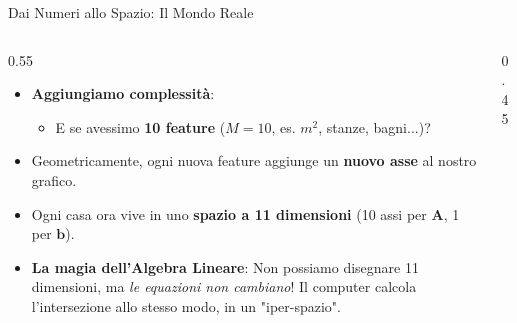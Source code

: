 \documentclass[aspectratio=169, 10pt]{beamer}
\begin{document}
\begin{frame}{Dai Numeri allo Spazio: Il Mondo Reale}
\begin{columns}[T]
    \begin{column}{0.55\textwidth}
        \small
        \begin{itemize}
            \setlength\itemsep{0.7em} %
            \item \textbf{Aggiungiamo complessità}:
            \begin{itemize}
                \item E se avessimo \textbf{10 feature} ($M=10$, es. $m^2$, stanze, bagni...)?
            \end{itemize}
            \item Geometricamente, ogni nuova feature aggiunge un \textbf{nuovo asse} al nostro grafico.
            \item Ogni casa ora vive in uno \textbf{spazio a 11 dimensioni} (10 assi per $\mathbf{A}$, 1 per $\mathbf{b}$).
            \item \textbf{La magia dell'Algebra Lineare}: 
            Non possiamo disegnare 11 dimensioni, ma \emph{le equazioni non cambiano}! Il computer calcola l'intersezione allo stesso modo, in un "iper-spazio".
        \end{itemize}
    \end{column}
    
    \begin{column}{0.45\textwidth}
        \centering
\end{column}
\end{columns}
\end{frame}
\end{document}
